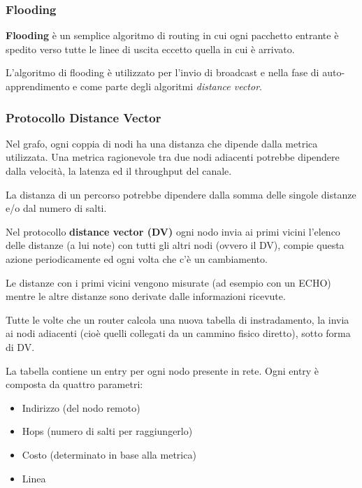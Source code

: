         \subsubsection{Flooding}
            \textbf{Flooding} è un semplice algoritmo di routing in cui ogni pacchetto entrante è spedito verso tutte le linee di uscita eccetto quella in cui è arrivato.
        
            L'algoritmo di flooding è utilizzato per l'invio di broadcast e nella fase di auto-apprendimento e come parte degli algoritmi \textit{distance vector}.

        \subsubsection{Protocollo Distance Vector}
            Nel grafo, ogni coppia di nodi ha una distanza che dipende dalla metrica utilizzata. Una metrica ragionevole tra due nodi adiacenti potrebbe dipendere dalla velocità, la latenza ed il throughput del canale.
        
            La distanza di un percorso potrebbe dipendere dalla somma delle singole distanze e/o dal numero di salti.

            Nel protocollo \textbf{distance vector (DV)} ogni nodo invia ai primi vicini l'elenco delle distanze (a lui note) con tutti gli altri nodi (ovvero il DV), compie questa azione periodicamente ed ogni volta che c'è un cambiamento.

            Le distanze con i primi vicini vengono misurate (ad esempio con un ECHO) mentre le altre distanze sono derivate dalle informazioni ricevute.

            Tutte le volte che un router calcola una nuova tabella di instradamento, la invia ai nodi adiacenti (cioè quelli collegati da un cammino fisico diretto), sotto forma di DV.
            
            La tabella contiene un entry per ogni nodo presente in rete. Ogni entry è composta da quattro parametri:
            \begin{itemize}
                \item Indirizzo (del nodo remoto)
                \item Hops (numero di salti per raggiungerlo)
                \item Costo (determinato in base alla metrica)
                \item Linea
            \end{itemize}

